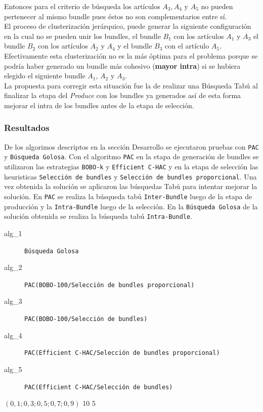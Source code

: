 Entonces para el criterio de búsqueda los artículos $A_3, A_4$ y $A_5$ no pueden pertenecer al mismo bundle pues éstos no son complementarios entre sí.\\
El proceso de clusterización jerárquico, puede generar la siguiente configuración en la cual no se pueden unir los bundles, el bundle $B_1$ con los artículos $A_1$ y $A_3$ el bundle $B_2$ con los artículos $A_2$ y $A_4$ y el bundle $B_3$ con el artículo $A_5$. Efectivamente esta clusterización no es la más óptima para el problema porque se podría haber generado un bundle más cohesivo (\textbf{mayor intra}) si se hubiera elegido el siguiente bundle $A_1$, $A_2$ y $A_3$.\\
La propuesta para corregir esta situación fue la de realizar una Búsqueda Tabú al finalizar la etapa del \textit{Produce} con los bundles ya generados así de esta forma mejorar el intra de los bundles antes de la etapa de selección.
\subsubsection{Resultados}
De los algorimos descriptos en la sección Desarrollo se ejecutaron pruebas con \texttt{PAC} y \texttt{Búsqueda Golosa}. Con el algoritmo \texttt{PAC} en la etapa de generación de bundles se utilizaron las estrategias \texttt{BOBO-k} y \texttt{Efficient C-HAC} y en la etapa de selección las heuristicas \texttt{Selección de bundles} y \texttt{Selección de bundles proporcional}. Una vez obtenida la solución se aplicaron las búsquedas Tabú para intentar mejorar la solución. En \texttt{PAC} se realiza la búsqueda tabú \texttt{Inter-Bundle} luego de la etapa de producción y la \texttt{Intra-Bundle} luego de la selección. En la \texttt{Búsqueda Golosa} de la solución obtenida se realiza la búsqueda tabú \texttt{Intra-Bundle}.\\

\Solucion
{}
{
\begin{description}
	\item[alg\_1] \texttt{Búsqueda Golosa}
	\item[alg\_2] \texttt{PAC(BOBO-100/Selección de bundles proporcional)}
	\item[alg\_3] \texttt{PAC(BOBO-100/Selección de bundles)}
	\item[alg\_4] \texttt{PAC(Efficient C-HAC/Selección de bundles proporcional)}
	\item[alg\_5] \texttt{PAC(Efficient C-HAC/Selección de bundles)}
\end{description}
}
{$(0,1; 0,3; 0,5; 0,7; 0,9)$}
{10}
{5}

